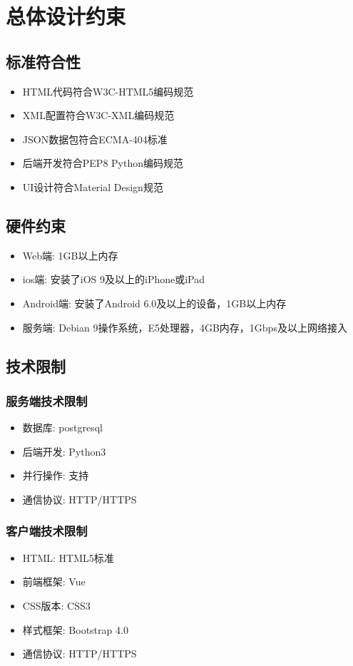 \chapter{总体设计约束}


\section{标准符合性}


\begin{itemize}
	\item HTML代码符合W3C-HTML5编码规范
	\item XML配置符合W3C-XML编码规范
	\item JSON数据包符合ECMA-404标准
	\item 后端开发符合PEP8 Python编码规范
	\item UI设计符合Material Design规范
\end{itemize}


\section{硬件约束}

\begin{itemize}
	\item Web端: 1GB以上内存
	\item ios端: 安装了iOS 9及以上的iPhone或iPad
	\item Android端: 安装了Android 6.0及以上的设备，1GB以上内存
	\item 服务端: Debian 9操作系统，E5处理器，4GB内存，1Gbps及以上网络接入
\end{itemize}


\section{技术限制}

\subsection{服务端技术限制}

\begin{itemize}
	\item 数据库: postgresql
	\item 后端开发: Python3
	\item 并行操作: 支持
	\item 通信协议: HTTP/HTTPS
\end{itemize}

\subsection{客户端技术限制}

\begin{itemize}
	\item HTML: HTML5标准
	\item 前端框架: Vue
	\item CSS版本: CSS3
	\item 样式框架: Bootstrap 4.0
	\item 通信协议: HTTP/HTTPS
\end{itemize}

